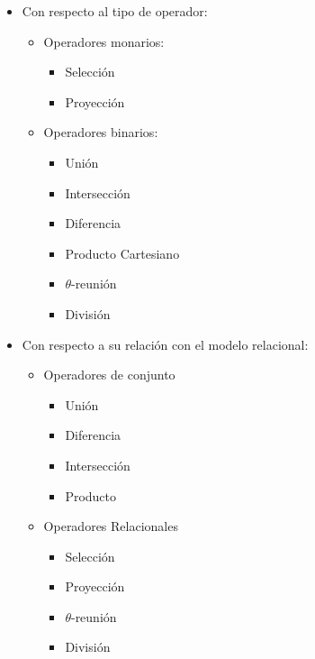 \documentclass[a4paper,11pt]{article}
\begin{document}
\begin{itemize}
\item Con respecto al tipo de operador:
	\begin{itemize}
		\item Operadores monarios:
			\begin{itemize}
				\item Selección
				\item Proyección
			\end{itemize}
		
		\item Operadores binarios:
			\begin{itemize}
				\item Unión
				\item Intersección
				\item Diferencia
				\item Producto Cartesiano
				\item $\theta$-reunión
				\item División
			\end{itemize}
	\end{itemize}

\item Con respecto a su relación con el modelo relacional:
	\begin{itemize}
		\item Operadores de conjunto
			\begin{itemize}
				\item Unión 
				\item Diferencia
				\item Intersección
				\item Producto
			\end{itemize}
			
		\item Operadores Relacionales
			\begin{itemize}
				\item Selección
				\item Proyección
				\item $\theta$-reunión
				\item División
			\end{itemize}
	\end{itemize}


\end{itemize}
\end{document}
